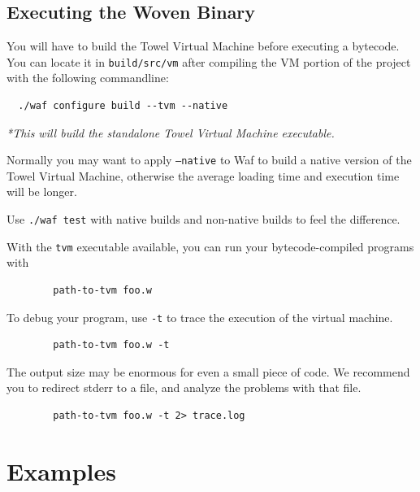 \documentclass{report}
\begin{document}
\section{Executing the Woven Binary}

You will have to build the Towel Virtual Machine before executing a bytecode. You can locate it in \texttt{build/src/vm} after compiling the VM portion of the project with the following commandline:

\begin{mdframed}[style=example]
\begin{verbatim}
  ./waf configure build --tvm --native
\end{verbatim}

\textit{*This will build the standalone Towel Virtual Machine executable.}
\end{mdframed}

\begin{mdframed}[style=hint]
  Normally you may want to apply \texttt{--native} to Waf to build a native version of the Towel Virtual Machine, otherwise the average loading time and execution time will be longer.

  Use \texttt{./waf test} with native builds and non-native builds to feel the difference.
\end{mdframed}

With the \texttt{tvm} executable available, you can run your bytecode-compiled programs with
\begin{verbatim}
        path-to-tvm foo.w
\end{verbatim}

To debug your program, use \texttt{-t} to trace the execution of the virtual machine.
\begin{verbatim}
        path-to-tvm foo.w -t
\end{verbatim}

\begin{mdframed}[style=hint]
  The output size may be enormous for even a small piece of code. We recommend you to redirect stderr to a file, and analyze the problems with that file.
\begin{verbatim}
        path-to-tvm foo.w -t 2> trace.log
\end{verbatim}
\end{mdframed}

\chapter{Examples}
\label{chap:examples}
\end{document}
